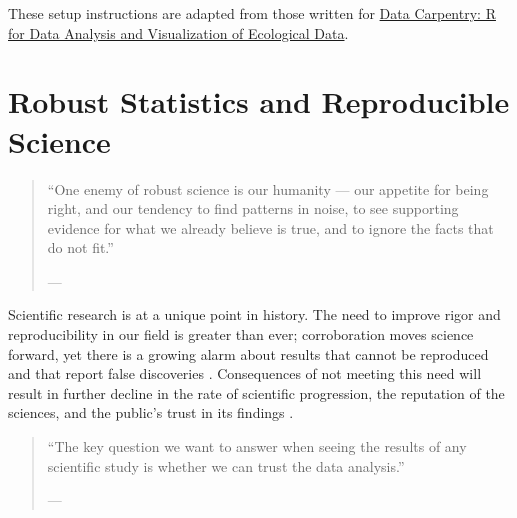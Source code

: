\documentclass[12pt, krantz2,]{book}
\theoremstyle{definition}
\theoremstyle{definition}
\theoremstyle{definition}
\newcommand{\1}{\mathbbm{1}}
\begin{document}
These setup instructions are adapted from those written for \href{http://www.datacarpentry.org/R-ecology-lesson/}{Data Carpentry: R
for Data Analysis and Visualization of Ecological
Data}.

\hypertarget{robust}{%
\chapter{Robust Statistics and Reproducible Science}\label{robust}}

\begin{quote}
``One enemy of robust science is our humanity --- our appetite for
being right, and our tendency to find patterns in noise, to see supporting
evidence for what we already believe is true, and to ignore the facts that do
not fit.''

--- \citet{naturenews_2015}
\end{quote}

Scientific research is at a unique point in history. The need to improve rigor
and reproducibility in our field is greater than ever; corroboration moves
science forward, yet there is a growing alarm about results that cannot be
reproduced and that report false discoveries \citep{baker2016there}. Consequences of
not meeting this need will result in further decline in the rate of scientific
progression, the reputation of the sciences, and the public's trust in its
findings \citep{munafo2017manifesto, naturenews2_2015}.

\begin{quote}
``The key question we want to answer when seeing the results of any scientific
study is whether we can trust the data analysis.''

--- \citet{peng2015reproducibility}
\end{quote}
\end{document}
